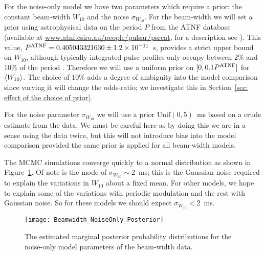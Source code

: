 \documentclass[../full_thesis/full_thesis.tex]{subfiles}
\begin{document}
For the noise-only model we have two parameters which require a prior: the
constant beam-width $W_{10}$ and the noise $\sigma_{W_{10}}$. For the
beam-width we will set a prior using astrophysical data on the period $P$
from the ATNF database
(available at \url{www.atnf.csiro.au/people/pulsar/psrcat}, for a description
see \cite{ATNF}). This value, $P^{\mathrm{ATNF}}=0.405043321630\pm 1.2\times10^{-11}$~s,
provides a strict upper bound on $W_{10}$, although typically integrated
pulse profiles only occupy between 2\% and 10\% of the period \citep{Lyne1988}.
Therefore we will use a uniform prior on $[0, 0.1 P^{\mathrm{ATNF}}]$ for $\langle W_{10} \rangle$.
The choice of 10\% adds a degree of ambiguity into the model comparison since
varying it will change the odds-ratio; we investigate this in
Section~\ref{sec: effect of the choice of prior}.

For the noise parameter
$\sigma_{W_{10}}$ we will use a prior $\textrm{Unif}(0, 5)$~ms
based on a crude estimate from the data. We must be careful here as by doing
this we are in a sense using the data twice, but this will not introduce bias
into the model comparison provided the same prior is applied for all beam-width
models.

The MCMC simulations converge quickly to a normal distribution as shown in
Figure~\ref{fig: noise-only beam-width posterior}. Of note is the mode of
$\sigma_{W_{10}}\sim 2$~ms; this is the Gaussian noise required to explain the
variations in $W_{10}$ about a fixed mean. For other models, we hope to explain
some of the variations with periodic modulation and the rest with Gaussian
noise. So for these models we should expect $\sigma_{W_{10}} < 2$~ms.

\begin{figure}
\centering
\texttt{[image: Beamwidth\_NoiseOnly\_Posterior]}
\caption{The estimated marginal posterior probability distributions for the
noise-only model parameters of the beam-width data.}
\label{fig: noise-only beam-width posterior}
\end{figure}
\end{document}
